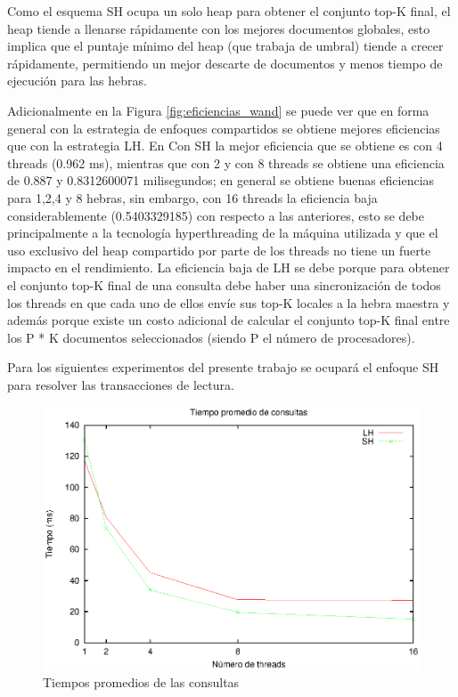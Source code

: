 Como el esquema SH ocupa un solo heap para obtener el conjunto top-K final, el heap tiende a llenarse rápidamente con los mejores documentos globales, esto implica que el puntaje mínimo del heap (que trabaja de umbral) tiende a crecer rápidamente, permitiendo un mejor descarte de documentos y menos tiempo de ejecución para las hebras. 

Adicionalmente en la Figura \ref{fig:eficiencias_wand} se puede ver que en forma general con la estrategia de enfoques compartidos se obtiene mejores eficiencias que con la estrategia LH. En Con SH la mejor eficiencia que se obtiene es con 4 threads (0.962 ms), mientras que con 2 y con 8 threads se obtiene una eficiencia de 0.887 y 0.8312600071 milisegundos; en general se obtiene buenas eficiencias para 1,2,4 y 8 hebras, sin embargo, con 16 threads la eficiencia baja considerablemente (0.5403329185) con respecto a las anteriores, esto se debe principalmente a la tecnología hyperthreading de la máquina utilizada y que el uso exclusivo del heap compartido por parte de los threads no tiene un fuerte impacto en el rendimiento.  
La eficiencia baja de LH se debe porque para obtener el conjunto top-K final de una consulta debe haber una sincronización de todos los threads en que cada uno de ellos envíe sus top-K locales a la hebra maestra y además porque existe un costo adicional de calcular el conjunto top-K final entre los P * K documentos seleccionados (siendo P el número de procesadores). 
                     
Para los siguientes experimentos del presente trabajo se ocupará el enfoque SH para resolver las transacciones de lectura.


\begin{figure}[!ht]
\centering
\includegraphics[scale=.75]{images/tiempos_wand.eps}
\caption{Tiempos promedios de las consultas}
\label{fig:tiempos_wand}
\end{figure}

